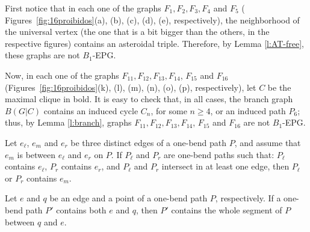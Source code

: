 \documentclass{dmgt}
\begin{document}
First notice that in each one of the graphs $F_{1}, F_{2}, F_{3}, F_{4}$ and $F_{5}$ ( Figures~\ref{fig:16proibidos}(a), (b), (c), (d), (e), respectively), the neighborhood of the universal vertex (the one that is a bit bigger than the others, in the respective figures) contains an asteroidal triple. Therefore, by Lemma \ref{l:AT-free}, these graphs are not  $B_1$-EPG.

Now, in each one of the graphs $F_{11}, F_{12}, F_{13}, F_{14}$, $F_{15}$ and $F_{16}$  (Figures~\ref{fig:16proibidos}(k), (l), (m), (n), (o), (p), respectively), let $C$ be the maximal clique in bold. It is easy to check that, in all cases, the branch graph $B(G|C)$ contains an induced cycle $C_n$, for some $n\geq 4$, or an induced path $P_6$; thus, by Lemma \ref{l:branch},  graphs $F_{11}, F_{12}, F_{13}, F_{14}$, $F_{15}$ and $F_{16}$ are not $B_1$-EPG.





\begin{obs} \label{f:between}Let $e_{\ell}$, $e_m$ and $e_r$  be three distinct edges of a  one-bend path $P$, and assume that $e_m$ is between $e_{\ell}$ and $e_r$ on $P$. If $P_{\ell}$ and $P_r$ are one-bend paths such that: $P_{\ell}$ contains $e_{\ell}$, $P_r$ contains $e_r$, and  $P_{\ell}$ and $P_r$ intersect in at least one edge, then $P_{\ell}$ or $P_r$ contains $e_m$.
\end{obs}
\begin{obs} \label{f:two points} Let  $e$ and $q$  be an edge and a  point  of a  one-bend path $P$, respectively. If a one-bend path $P'$ contains both $e$ and $q$, then $P'$ contains the whole segment of $P$ between $q$ and $e$.
\end{obs}
\end{document}
